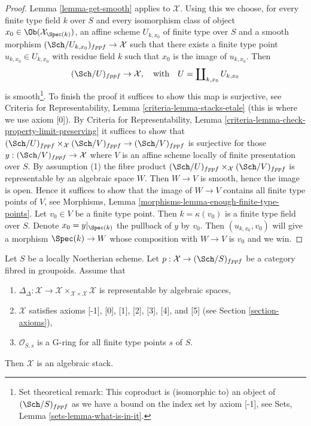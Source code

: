 \begin{proof}
Lemma \ref{lemma-get-smooth} applies to $\mathcal{X}$. Using this we
choose, for every finite type field $k$ over $S$ and every
isomorphism class of object $x_0 \in \Ob(\mathcal{X}_{\Spec(k)})$,
an affine scheme $U_{k, x_0}$ of finite type over $S$ and a smooth morphism
$(\Sch/U_{k, x_0})_{fppf} \to \mathcal{X}$ such that there exists a finite
type point $u_{k, x_0} \in U_{k, x_0}$ with residue field $k$ such that $x_0$
is the image of $u_{k, x_0}$. Then
$$
(\Sch/U)_{fppf} \to \mathcal{X},
\quad\text{with}\quad
U = \coprod\nolimits_{k, x_0} U_{k, x_0}
$$
is smooth\footnote{Set theoretical remark: This coproduct is (isomorphic to)
an object of $(\Sch/S)_{fppf}$ as we have a bound on the index set
by axiom [-1], see Sets, Lemma \ref{sets-lemma-what-is-in-it}.}.
To finish the proof it suffices to show this map is surjective,
see Criteria for Representability, Lemma \ref{criteria-lemma-stacks-etale}
(this is where we use axiom [0]). By Criteria for Representability, Lemma
\ref{criteria-lemma-check-property-limit-preserving}
it suffices to show that
$(\Sch/U)_{fppf} \times_\mathcal{X} (\Sch/V)_{fppf} \to (\Sch/V)_{fppf}$
is surjective for those $y : (\Sch/V)_{fppf} \to \mathcal{X}$ where
$V$ is an affine scheme locally of finite presentation
over $S$. By assumption (1) the fibre product
$(\Sch/U)_{fppf} \times_\mathcal{X} (\Sch/V)_{fppf}$ is representable
by an algebraic space $W$. Then $W \to V$ is smooth, hence the image is
open. Hence it suffices to show that the image of $W \to V$ contains all
finite type points of $V$, see
Morphisms, Lemma \ref{morphisms-lemma-enough-finite-type-points}.
Let $v_0 \in V$ be a finite type point. Then $k = \kappa(v_0)$ is
a finite type field over $S$. Denote $x_0 = y|_{\Spec(k)}$
the pullback of $y$ by $v_0$. Then $(u_{k, x_0}, v_0)$ will give
a morphism $\Spec(k) \to W$ whose composition with $W \to V$
is $v_0$ and we win.
\end{proof}

\begin{proposition}
\label{proposition-second-diagonal-representable}
Let $S$ be a locally Noetherian scheme. Let
$p : \mathcal{X} \to (\Sch/S)_{fppf}$ be a category fibred in groupoids.
Assume that
\begin{enumerate}
\item $\Delta_\Delta : \mathcal{X} \to
\mathcal{X} \times_{\mathcal{X} \times \mathcal{X}} \mathcal{X}$
is representable by algebraic spaces,
\item $\mathcal{X}$ satisfies axioms [-1], [0], [1], [2], [3], [4], and [5]
(see Section \ref{section-axioms}),
\item $\mathcal{O}_{S, s}$ is a G-ring for all finite type points $s$ of $S$.
\end{enumerate}
Then $\mathcal{X}$ is an algebraic stack.
\end{proposition}

